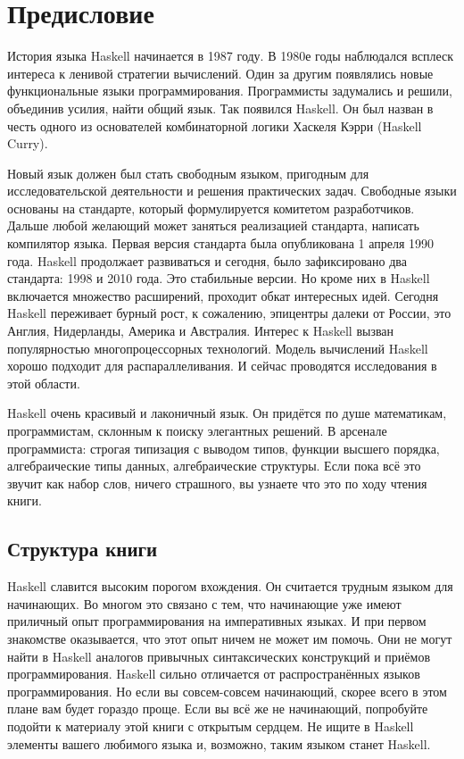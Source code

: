 \chapter{Предисловие}

История языка Haskell начинается в 1987 году. В 1980е годы наблюдался
всплеск интереса к ленивой стратегии вычислений. Один за другим
появлялись новые функциональные языки программирования. Программисты
задумались и решили, объединив усилия, найти общий язык. Так появился
Haskell. Он был назван в честь одного из основателей комбинаторной
логики Хаскеля Кэрри (Haskell Curry).

Новый язык должен был стать свободным языком, пригодным для
исследовательской деятельности и решения практических задач. Свободные
языки основаны на стандарте, который формулируется комитетом
разработчиков. Дальше любой желающий может заняться реализацией
стандарта, написать компилятор языка. Первая версия стандарта была
опубликована 1 апреля 1990 года. Haskell продолжает развиваться и
сегодня, было зафиксировано два стандарта: 1998 и 2010 года. Это
стабильные версии. Но кроме них в Haskell включается множество
расширений, проходит обкат интересных идей. Сегодня Haskell переживает
бурный рост, к сожалению, эпицентры далеки от России, это Англия,
Нидерланды, Америка и Австралия. Интерес к Haskell вызван популярностью
многопроцессорных технологий. Модель вычислений Haskell хорошо подходит
для распараллеливания. И сейчас проводятся исследования в этой области.

Haskell очень красивый и лаконичный язык. Он придётся по душе
математикам, программистам, склонным к поиску элегантных решений. В
арсенале программиста: строгая типизация с выводом типов, функции
высшего порядка, алгебраические типы данных, алгебраические структуры.
Если пока всё это звучит как набор слов, ничего страшного, вы узнаете
что это по ходу чтения книги.

\section{Структура книги}

Haskell славится высоким порогом вхождения. Он считается трудным языком
для начинающих. Во многом это связано с тем, что начинающие уже имеют
приличный опыт программирования на императивных языках. И при первом
знакомстве оказывается, что этот опыт ничем не может им помочь. Они не
могут найти в Haskell аналогов привычных синтаксических конструкций и
приёмов программирования. Haskell сильно отличается от распространённых
языков программирования. Но если вы совсем-совсем начинающий, скорее
всего в этом плане вам будет гораздо проще. Если вы всё же не
начинающий, попробуйте подойти к материалу этой книги с открытым
сердцем. Не ищите в Haskell элементы вашего любимого языка и, возможно,
таким языком станет Haskell.

